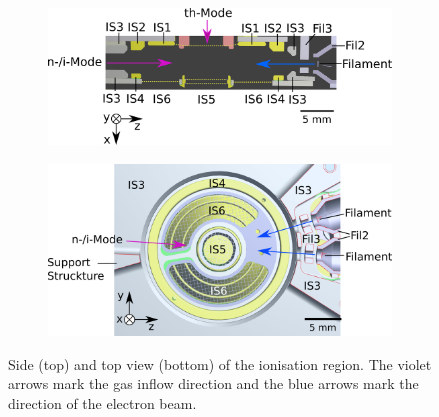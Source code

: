 	\begin{figure}[h] %
		\begin{subfigure}[t]{\textwidth}
			\centering
			\includegraphics[width=.8\textwidth]{Experiments/PFMEntrance_Side_Schema.png}
		\end{subfigure}
		\par\bigskip
		\begin{subfigure}[b]{\textwidth}
			\centering
			\includegraphics[width=.85\textwidth]{Experiments/PFMEntrance_Top_Schema.png}
		\end{subfigure}
		\caption{Side (top) and top view (bottom) of the ionisation region. The violet arrows mark the gas inflow direction and the blue arrows mark the direction of the electron beam.}
		\label{fig:PFMentrSideTopSchemas}
	\end{figure}

